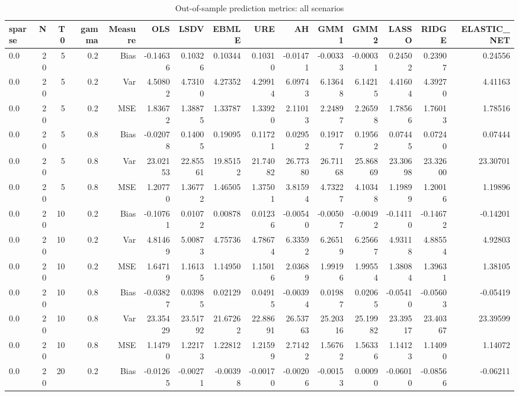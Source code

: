 \begin{table}[!htbp]\centering
\caption{Out-of-sample prediction metrics: all scenarios}
\label{tab:table3_all_scenarios}
\begin{tabular}{lrrrrrrrrrrrrrr}
\hline
sparse & N & T0 & gamma & Measure & OLS & LSDV & EBMLE & URE & AH & GMM1 & GMM2 & LASSO & RIDGE & ELASTIC_NET \\
\hline
0.0 &  20 &  5 & 0.2 & Bias & -0.14636 & 0.10326 & 0.10344 & 0.10310 & -0.01471 & -0.00333 & -0.00031 & 0.24502 & 0.23907 & 0.24556 \\
0.0 &  20 &  5 & 0.2 & Var & 4.50802 & 4.73100 & 4.27352 & 4.29914 & 6.09743 & 6.13648 & 6.14215 & 4.41604 & 4.39270 & 4.41163 \\
0.0 &  20 &  5 & 0.2 & MSE & 1.83672 & 1.38875 & 1.33787 & 1.33920 & 2.11013 & 2.24897 & 2.26598 & 1.78566 & 1.76013 & 1.78516 \\
0.0 &  20 &  5 & 0.8 & Bias & -0.02078 & 0.14005 & 0.19095 & 0.11721 & 0.02952 & 0.19177 & 0.19562 & 0.07445 & 0.07240 & 0.07444 \\
0.0 &  20 &  5 & 0.8 & Var & 23.02153 & 22.85561 & 19.85152 & 21.74082 & 26.77380 & 26.71168 & 25.86869 & 23.30698 & 23.32600 & 23.30701 \\
0.0 &  20 &  5 & 0.8 & MSE & 1.20770 & 1.36772 & 1.46505 & 1.37501 & 3.81594 & 4.73227 & 4.10348 & 1.19899 & 1.20016 & 1.19896 \\
0.0 &  20 & 10 & 0.2 & Bias & -0.10761 & 0.01072 & 0.00878 & 0.01236 & -0.00540 & -0.00507 & -0.00492 & -0.14110 & -0.14672 & -0.14201 \\
0.0 &  20 & 10 & 0.2 & Var & 4.81469 & 5.00873 & 4.75736 & 4.78674 & 6.33592 & 6.26519 & 6.25667 & 4.93118 & 4.88554 & 4.92803 \\
0.0 &  20 & 10 & 0.2 & MSE & 1.64719 & 1.16135 & 1.14950 & 1.15016 & 2.03689 & 1.99196 & 1.99554 & 1.38084 & 1.39631 & 1.38105 \\
0.0 &  20 & 10 & 0.8 & Bias & -0.03827 & 0.03985 & 0.02129 & 0.04915 & -0.00394 & 0.01987 & 0.02065 & -0.05410 & -0.05603 & -0.05419 \\
0.0 &  20 & 10 & 0.8 & Var & 23.35429 & 23.51792 & 21.67262 & 22.88691 & 26.53763 & 25.20316 & 25.19982 & 23.39517 & 23.40367 & 23.39599 \\
0.0 &  20 & 10 & 0.8 & MSE & 1.14790 & 1.22173 & 1.22812 & 1.21599 & 2.71422 & 1.56762 & 1.56336 & 1.14123 & 1.14090 & 1.14072 \\
0.0 &  20 & 20 & 0.2 & Bias & -0.01265 & -0.00271 & -0.00398 & -0.00170 & -0.00206 & -0.00153 & 0.00090 & -0.06010 & -0.08566 & -0.06211 \\

\end{tabular}
\end{table}

